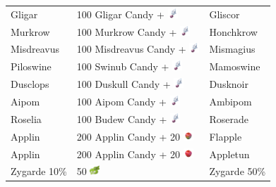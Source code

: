 \begin{table}
\begin{tabular}{lll}
    Gligar & 100 Gligar Candy + \includegraphics[width=1em,height=1em]{images/sinnohstone.png} & Gliscor	\\
    Murkrow & 100 Murkrow Candy + \includegraphics[width=1em,height=1em]{images/sinnohstone.png} & Honchkrow	\\
    Misdreavus & 100 Misdreavus Candy + \includegraphics[width=1em,height=1em]{images/sinnohstone.png} & Mismagius	\\
    Piloswine & 100 Swinub Candy + \includegraphics[width=1em,height=1em]{images/sinnohstone.png} & Mamoswine	\\
    Dusclops & 100 Duskull Candy + \includegraphics[width=1em,height=1em]{images/sinnohstone.png} & Dusknoir	\\
    Aipom & 100 Aipom Candy + \includegraphics[width=1em,height=1em]{images/sinnohstone.png} & Ambipom	\\
    Roselia & 100 Budew Candy + \includegraphics[width=1em,height=1em]{images/sinnohstone.png} & Roserade	\\
    Applin & 200 Applin Candy + 20 \includegraphics[width=1em,height=1em]{images/tartapple.png} & Flapple \\
    Applin & 200 Applin Candy + 20 \includegraphics[width=1em,height=1em]{images/sweetapple.png} & Appletun \\
    Zygarde 10\% & 50 \includegraphics[width=1em,height=1em]{images/zygardecell.png} & Zygarde 50\% \\

\end{tabular}
\end{table}
